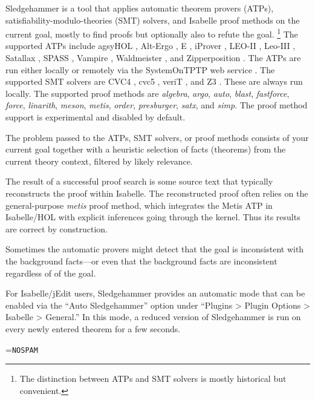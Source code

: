 \documentclass[a4paper,12pt]{article}
\renewcommand\_{\hbox{\textunderscore\kern-.05ex}}
\begin{document}
Sledgehammer is a tool that applies automatic theorem provers (ATPs),
satisfiability-modulo-theories (SMT) solvers, and Isabelle proof methods on the
current goal, mostly to find proofs but optionally also to refute the goal.%
\footnote{The distinction between ATPs and SMT solvers is mostly
historical but convenient.}
%
The supported ATPs include agsyHOL \cite{agsyHOL}, Alt-Ergo \cite{alt-ergo}, E
\cite{schulz-2019}, iProver \cite{korovin-2009}, LEO-II \cite{leo2}, Leo-III
\cite{leo3}, Satallax \cite{satallax}, SPASS \cite{weidenbach-et-al-2009},
Vampire \cite{riazanov-voronkov-2002}, Waldmeister \cite{waldmeister}, and
Zipperposition \cite{cruanes-2014}. The ATPs are run either locally or remotely
via the System\-On\-TPTP web service \cite{sutcliffe-2000}. The supported SMT
solvers are CVC4 \cite{cvc4}, cvc5 \cite{barbosa-et-al-cvc5}, veriT
\cite{bouton-et-al-2009}, and Z3 \cite{de-moura-2008}. These are always run
locally. The supported proof methods are \textit{algebra}, \textit{argo},
\textit{auto}, \textit{blast}, \textit{fastforce}, \textit{force},
\textit{linarith}, \textit{meson}, \textit{metis}, \textit{order},
\textit{presburger}, \textit{satx}, and \textit{simp}. The proof method support
is experimental and disabled by default.

The problem passed to the ATPs, SMT solvers, or proof methods consists
of your current goal together with a heuristic selection of facts (theorems)
from the current theory context, filtered by likely relevance.

The result of a successful proof search is some source text that typically
reconstructs the proof within Isabelle. The reconstructed proof often relies on
the general-purpose \textit{metis} proof method, which integrates the Metis ATP
in Isabelle/HOL with explicit inferences going through the kernel. Thus its
results are correct by construction.

Sometimes the automatic provers might detect that the goal is inconsistent with
the background facts---or even that the background facts are inconsistent
regardless of of the goal.

For Isabelle/jEdit users, Sledgehammer provides an automatic mode that can be
enabled via the ``Auto Sledgehammer'' option under ``Plugins > Plugin Options >
Isabelle > General.'' In this mode, a reduced version of Sledgehammer is run on
every newly entered theorem for a few seconds.

\newbox\boxA
\setbox\boxA=\hbox{\texttt{NOSPAM}}

\newcommand\authoremail{\texttt{jasmin.blan{\color{white}NOSPAM}\kern-\wd\boxA{}chette@\allowbreak
gmail.\allowbreak com}}
\end{document}
